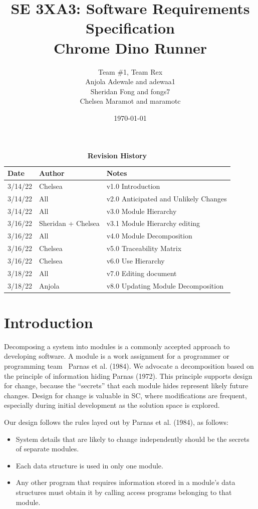 \documentclass[12pt, titlepage]{article}
\title{SE 3XA3: Software Requirements Specification\\Chrome Dino Runner}
\author{Team \#1, Team Rex
		\\ Anjola Adewale and adewaa1
		\\ Sheridan Fong and fongs7
		\\ Chelsea Maramot and maramotc
}
\date{\today}
\begin{document}
\maketitle

\tableofcontents
\listoftables
\listoffigures

\begin{table}[H]
\caption{\bf Revision History}
\begin{tabularx}{\textwidth}{p{3cm}p{2cm}X}
\toprule {\bf Date} & {\bf Author} & {\bf Notes}\\
\midrule
3/14/22 & Chelsea & v1.0 Introduction \\

3/14/22 & All & v2.0 Anticipated and Unlikely Changes \\
3/14/22 & All & v3.0 Module Hierarchy \\
3/16/22 & Sheridan + Chelsea & v3.1 Module Hierarchy editing \\
3/16/22 & All & v4.0 Module Decomposition \\
3/16/22 & Chelsea & v5.0 Traceability Matrix \\
3/16/22 & Chelsea & v6.0 Use Hierarchy \\
3/18/22 & All & v7.0 Editing document \\
3/18/22 & Anjola & v8.0 Updating Module Decomposition \\
\bottomrule
\end{tabularx}
\end{table}

\newpage


\section{Introduction}

Decomposing a system into modules is a commonly accepted approach to developing
software.  A module is a work assignment for a programmer or programming
team~ Parnas et al. (1984).  We advocate a decomposition
based on the principle of information hiding Parnas (1972).  This
principle supports design for change, because the ``secrets'' that each module
hides represent likely future changes.  Design for change is valuable in SC,
where modifications are frequent, especially during initial development as the
solution space is explored.  

Our design follows the rules layed out by Parnas et al. (1984), as follows:
\begin{itemize}
\item System details that are likely to change independently should be the
  secrets of separate modules.
\item Each data structure is used in only one module.
\item Any other program that requires information stored in a module's data
  structures must obtain it by calling access programs belonging to that module.
\end{itemize}
\end{document}
